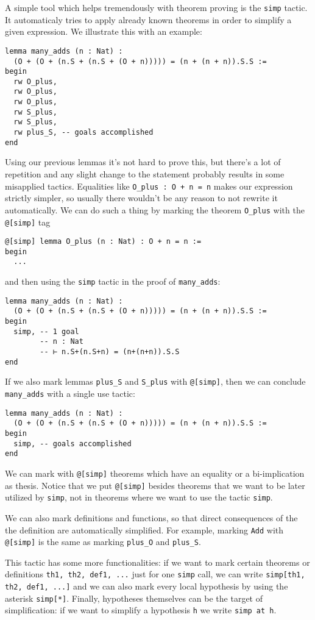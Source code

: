 \documentclass{book}
\theoremstyle{definition}
\theoremstyle{remark}
\theoremstyle{plain}
\begin{document}
A simple tool which helps tremendously with theorem proving is the \lstinline{simp} tactic.
It automaticaly tries to apply already known theorems in order to simplify a given expression.
We illustrate this with an example:
\begin{lstlisting}
lemma many_adds (n : Nat) :
  (O + (O + (n.S + (n.S + (O + n))))) = (n + (n + n)).S.S :=
begin
  rw O_plus,
  rw O_plus,
  rw O_plus,
  rw S_plus,
  rw S_plus,
  rw plus_S, -- goals accomplished
end
\end{lstlisting}
Using our previous lemmas it's not hard to prove this,
but there's a lot of repetition and any slight change to the statement probably results in some misapplied tactics.
Equalities like \lstinline{O_plus : O + n = n} makes our expression strictly simpler,
so usually there wouldn't be any reason to not rewrite it automatically.
We can do such a thing by marking the theorem \lstinline{O_plus} with the \lstinline{@[simp]} tag
\begin{lstlisting}
@[simp] lemma O_plus (n : Nat) : O + n = n :=
begin
  ...  
\end{lstlisting}
and then using the \lstinline{simp} tactic in the proof of \lstinline{many_adds}:
\begin{lstlisting}
lemma many_adds (n : Nat) :
  (O + (O + (n.S + (n.S + (O + n))))) = (n + (n + n)).S.S :=
begin
  simp, -- 1 goal
        -- n : Nat
        -- ⊢ n.S+(n.S+n) = (n+(n+n)).S.S
end
\end{lstlisting}
If we also mark lemmas \lstinline{plus_S} and \lstinline{S_plus} with \lstinline{@[simp]},
then we can conclude \lstinline{many_adds} with a single use tactic:
\begin{lstlisting}
lemma many_adds (n : Nat) :
  (O + (O + (n.S + (n.S + (O + n))))) = (n + (n + n)).S.S :=
begin
  simp, -- goals accomplished
end  
\end{lstlisting}
We can mark with \lstinline{@[simp]} theorems which have an equality or a bi-implication as thesis.
Notice that we put \lstinline{@[simp]} besides theorems that we want to be later utilized by \lstinline{simp},
not in theorems where we want to use the tactic \lstinline{simp}.

We can also mark definitions and functions,
so that direct consequences of the the definition are automatically simplified.
For example, marking \lstinline{Add} with \lstinline{@[simp]} is the same as marking \lstinline{plus_O} and \lstinline{plus_S}. 

This tactic has some more functionalities: if we want to mark certain theorems or definitions \lstinline{th1, th2, def1, ...}
just for one \lstinline{simp} call, we can write \lstinline{simp[th1, th2, def1, ...]} and we can also mark every local hypothesis
by using the asterisk \lstinline{simp[*]}.
Finally, hypotheses themselves can be the target of simplification:
if we want to simplify a hypothesis \lstinline{h} we write \lstinline{simp at h}.
\end{document}
